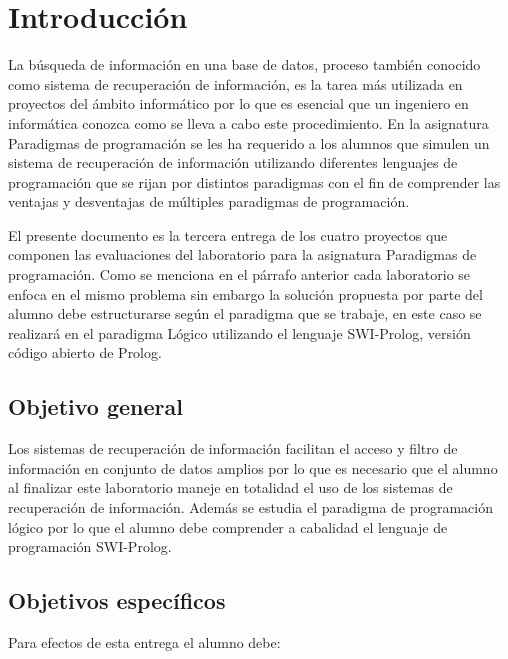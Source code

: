 \documentclass[letterpaper,12pt]{report}
\begin{document}

\chapter{Introducción}

La búsqueda de información en una base de datos, proceso también conocido como sistema de recuperación de información, es la tarea más utilizada en proyectos del ámbito informático por lo que es esencial que un ingeniero en informática conozca como se lleva a cabo este procedimiento. En la asignatura Paradigmas de programación se les ha requerido a los alumnos que simulen un sistema de recuperación de información utilizando diferentes lenguajes de programación que se rijan por distintos paradigmas con el fin de comprender las ventajas y desventajas de múltiples paradigmas de programación.

El presente documento es la tercera entrega de los cuatro proyectos que componen las evaluaciones del laboratorio para la asignatura Paradigmas de programación. Como se menciona en el párrafo anterior cada laboratorio se enfoca en el mismo problema sin embargo la solución propuesta por parte del alumno debe estructurarse según el paradigma que se trabaje, en este caso se realizará en el paradigma Lógico utilizando el lenguaje SWI-Prolog, versión código abierto de Prolog.

\section {Objetivo general}

Los sistemas de recuperación de información facilitan el acceso y filtro de información en conjunto de datos amplios por lo que es necesario que el alumno al finalizar este laboratorio maneje en totalidad el uso de los sistemas de recuperación de información. Además se estudia el paradigma de programación lógico por lo que el alumno debe comprender a cabalidad el lenguaje de programación SWI-Prolog.

\vspace{2cm} 

\section {Objetivos específicos}

Para efectos de esta entrega el alumno debe:
\end{document}
